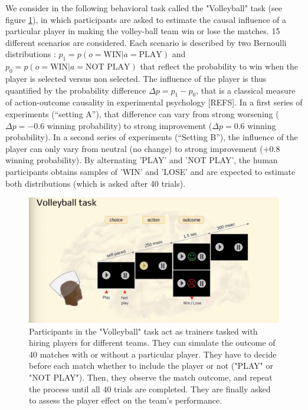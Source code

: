 \documentclass[10pt,letterpaper]{article}
\begin{document}
We consider in the following behavioral task called the "Volleyball" task (see figure \ref{fig:1})\cite{basanisi2021neurophysiological}, in which participants are asked to estimate the causal influence of a particular player in making the volley-ball team win or lose the matches. 15 different scenarios are considered. Each scenario is described by two Bernoulli distributions : $p_1=p(o=\text{WIN}|a=\text{PLAY})$ and  $p_0=p(o=\text{WIN}|a=\text{NOT PLAY})$ that reflect the probability to win when the player is selected versus non selected. The influence of the player is thus quantified by the probability difference $\Delta p = p_1 - p_0$, that is a classical measure of action-outcome causality in experimental psychology [REFS]. In a first series of experiments (``setting A''), that difference can vary from strong worsening ($\Delta p = -0.6$ winning probability) to strong improvement ($\Delta p = 0.6$ winning probability). In a second series of experiments (``Setting B''), the influence of the player can only vary from neutral (no change) to strong improvement ($+0.8$ winning probability).
By alternating 'PLAY' and 'NOT PLAY', the human participants obtains samples of 'WIN' and 'LOSE' and are expected to estimate both distributions (which is asked after 40 trials).

\begin{figure}[h]
\centering
\includegraphics[width=\textwidth]{figs/vb_task.png}
\caption{Participants in the "Volleyball" task act as trainers tasked with hiring players for different teams. They can simulate the outcome of 40 matches with or without a particular player. They have to decide before each match whether to include the player or not ("PLAY" or "NOT PLAY"). Then, they observe the match outcome, and repeat the process until all 40 trials are completed. They are finally asked to assess the player effect on the team's performance.}
\label{fig:1}
\end{figure}
\end{document}
